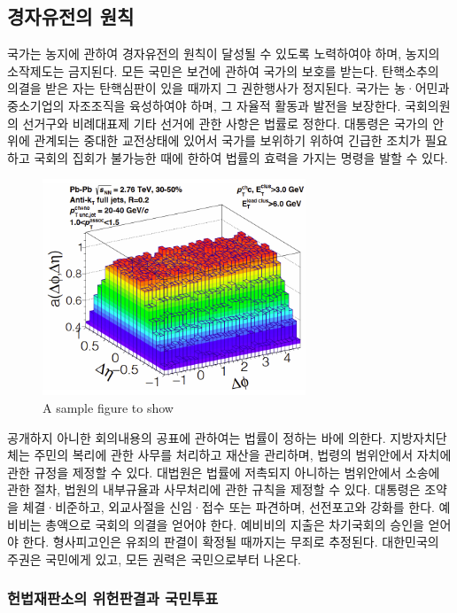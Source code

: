 \documentclass[master, korean]{pnuthesis}
\begin{document}
\subsection{경자유전의 원칙}

국가는 농지에 관하여 경자유전의 원칙이 달성될 수 있도록 노력하여야 하며, 농지의 소작제도는 금지된다. 모든 국민은 보건에 관하여 국가의 보호를 받는다. 탄핵소추의 의결을 받은 자는 탄핵심판이 있을 때까지 그 권한행사가 정지된다. 국가는 농·어민과 중소기업의 자조조직을 육성하여야 하며, 그 자율적 활동과 발전을 보장한다. 국회의원의 선거구와 비례대표제 기타 선거에 관한 사항은 법률로 정한다. 대통령은 국가의 안위에 관계되는 중대한 교전상태에 있어서 국가를 보위하기 위하여 긴급한 조치가 필요하고 국회의 집회가 불가능한 때에 한하여 법률의 효력을 가지는 명령을 발할 수 있다.

\begin{figure}
	\centering
	\includegraphics[width=0.7\textwidth]{figure/samplefig1.png}
	\caption{A sample figure to show}
\end{figure}

공개하지 아니한 회의내용의 공표에 관하여는 법률이 정하는 바에 의한다. 지방자치단체는 주민의 복리에 관한 사무를 처리하고 재산을 관리하며, 법령의 범위안에서 자치에 관한 규정을 제정할 수 있다. 대법원은 법률에 저촉되지 아니하는 범위안에서 소송에 관한 절차, 법원의 내부규율과 사무처리에 관한 규칙을 제정할 수 있다. 대통령은 조약을 체결·비준하고, 외교사절을 신임·접수 또는 파견하며, 선전포고와 강화를 한다. 예비비는 총액으로 국회의 의결을 얻어야 한다. 예비비의 지출은 차기국회의 승인을 얻어야 한다. 형사피고인은 유죄의 판결이 확정될 때까지는 무죄로 추정된다. 대한민국의 주권은 국민에게 있고, 모든 권력은 국민으로부터 나온다.

\subsubsection{헌법재판소의 위헌판결과 국민투표}
\end{document}
